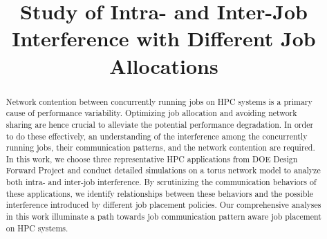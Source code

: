 \documentclass[conference]{IEEEtran}
\begin{document}
%
\title{Study of Intra- and Inter-Job Interference with Different Job Allocations}
\author{



}

\maketitle


\begin{abstract} 

Network contention between concurrently running jobs on HPC systems 
is a primary cause of performance variability. 
Optimizing job allocation and avoiding network sharing are 
hence crucial to alleviate the potential performance degradation. 
In order to do these effectively, 
an understanding of the interference among the concurrently running jobs, 
their communication patterns, and the network contention are required. 
In this work, we choose three representative HPC applications from 
DOE Design Forward Project and conduct detailed simulations  
on a torus network model to analyze both intra- and inter-job interference. 
By scrutinizing the communication behaviors of these applications, 
we identify relationships between these behaviors and 
the possible interference introduced by different job placement policies. 
Our comprehensive analyses in this work illuminate a path 
towards job communication pattern aware job placement on HPC systems.


\end{abstract}

\IEEEpeerreviewmaketitle
\end{document}
